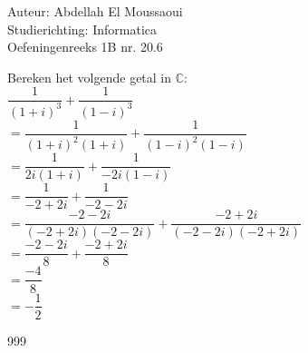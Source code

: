 \documentclass[a4paper]{article}
\begin{document}
  
\noindent \large Auteur: Abdellah El Moussaoui \\
\noindent \large Studierichting: Informatica\\
\noindent \large Oefeningenreeks 1B nr. 20.6\\

\medskip

\normalsize

\medskip

Bereken het volgende getal in $\mathbb{C}$: \\

$\dfrac{1}{(1+i)^3}+\dfrac{1}{(1-i)^3}$\\

$=\dfrac{1}{(1+i)^2(1+i)}+\dfrac{1}{(1-i)^2(1-i)}$\\

$=\dfrac{1}{2i(1+i)}+\dfrac{1}{-2i(1-i)}$\\

$=\dfrac{1}{-2+2i}+\dfrac{1}{-2-2i}$\\

$=\dfrac{-2-2i}{(-2+2i)(-2-2i)}+\dfrac{-2+2i}{(-2-2i)(-2+2i)}$\\

$=\dfrac{-2-2i}{8}+\dfrac{-2+2i}{8}$\\

$=\dfrac{-4}{8}$\\

$=-\dfrac{1}{2}$\\

\begin{thebibliography}{999}
\end{thebibliography}
\end{document}

